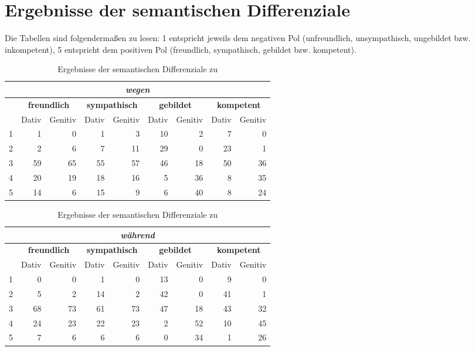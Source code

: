 \section*{Ergebnisse der semantischen Differenziale}
Die Tabellen sind folgendermaßen zu lesen: 1 entspricht jeweils dem negativen Pol (\glqq unfreundlich\grqq, \glqq unsympathisch\grqq, \glqq ungebildet\grqq{} bzw. \glqq inkompetent\grqq), 5 entspricht dem positiven Pol (\glqq freundlich\grqq, \glqq sympathisch\grqq, \glqq gebildet\grqq{} bzw. \glqq kompetent\grqq).
\begin{table}
\centering
\begin{tabular}{lrrrrrrrr}
\multicolumn{9}{c}{\textit{\textbf{wegen}}} \\ \hline
\textit{\textbf{}} & \multicolumn{2}{c}{\textbf{freundlich}} & \multicolumn{2}{c}{\textbf{sympathisch}} & \multicolumn{2}{c}{\textbf{gebildet}} & \multicolumn{2}{c}{\textbf{kompetent}} \\ %
 & \multicolumn{1}{c}{Dativ} & \multicolumn{1}{c}{Genitiv} & \multicolumn{1}{c}{Dativ} & \multicolumn{1}{c}{Genitiv} & \multicolumn{1}{c}{Dativ} & \multicolumn{1}{c}{Genitiv} & \multicolumn{1}{c}{Dativ} & \multicolumn{1}{c}{Genitiv} \\ \hline
1 & 1 & 0 & 1 & 3 & 10 & 2 & 7 & 0 \\ %
2 & 2 & 6 & 7 & 11 & 29 & 0 & 23 & 1 \\ %
3 & 59 & 65 & 55 & 57 & 46 & 18 & 50 & 36 \\ %
4 & 20 & 19 & 18 & 16 & 5 & 36 & 8 & 35 \\ %
5 & 14 & 6 & 15 & 9 & 6 & 40 & 8 & 24
\end{tabular}
\caption{Ergebnisse der semantischen Differenziale zu \wegen}
\label{table:sdswegenAnh}
\end{table}

\begin{table}
\centering
\begin{tabular}{lrrrrrrrr}
\multicolumn{9}{c}{\textit{\textbf{während}}} \\ \hline
\textit{\textbf{}} & \multicolumn{2}{c}{\textbf{freundlich}} & \multicolumn{2}{c}{\textbf{sympathisch}} & \multicolumn{2}{c}{\textbf{gebildet}} & \multicolumn{2}{c}{\textbf{kompetent}} \\ %
 & \multicolumn{1}{c}{Dativ} & \multicolumn{1}{c}{Genitiv} & \multicolumn{1}{c}{Dativ} & \multicolumn{1}{c}{Genitiv} & \multicolumn{1}{c}{Dativ} & \multicolumn{1}{c}{Genitiv} & \multicolumn{1}{c}{Dativ} & \multicolumn{1}{c}{Genitiv} \\ \hline
1 & 0 & 0 & 1 & 0 & 13 & 0 & 9 & 0 \\ %
2 & 5 & 2 & 14 & 2 & 42 & 0 & 41 & 1 \\ %
3 & 68 & 73 & 61 & 73 & 47 & 18 & 43 & 32 \\ %
4 & 24 & 23 & 22 & 23 & 2 & 52 & 10 & 45 \\ %
5 & 7 & 6 & 6 & 6 & 0 & 34 & 1 & 26
\end{tabular}
\caption{Ergebnisse der semantischen Differenziale zu \waehrend}
\label{table:sdswaehrendAnh}
\end{table}

